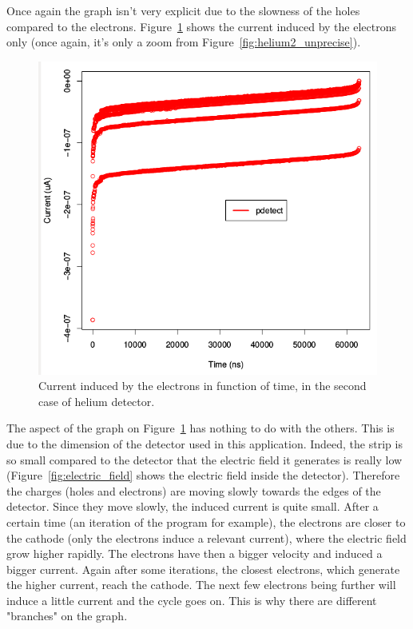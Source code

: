 \documentclass[11pt]{article}
\begin{document}
				Once again the graph isn't very explicit due to the slowness of the holes compared to the electrons.
				Figure~\ref{fig:helium2_precise} shows the current induced by the electrons only (once again, it's only
				a zoom from Figure~\ref{fig:helium2_unprecise}).

				\begin{figure}[H]
				  \center
				  \includegraphics[scale=0.4]{images/applications/helium2_precise.png}
				  \caption{Current induced by the electrons in function of time, in the second case of helium detector.}
				  \label{fig:helium2_precise}
				\end{figure}

				The aspect of the graph on Figure~\ref{fig:helium2_precise} has nothing to do with the others. This is due
				to the dimension of the detector used in this application. Indeed, the strip is so small compared to the
				detector that the electric field it generates is really low (Figure~\ref{fig:electric_field} shows the electric
				field inside the detector). Therefore the charges (holes and electrons) are moving slowly towards the edges of
				the detector. Since they move slowly, the induced current is quite small. After a certain time (an iteration
				of the program for example), the electrons are closer to the cathode (only the electrons induce a relevant current),
				where the electric field grow higher rapidly. The electrons have then a bigger velocity and induced a bigger
				current. Again after some iterations, the closest electrons, which generate the higher current, reach the cathode.
				The next few electrons being further will induce a little current and the cycle goes on. This is why there are
				different "branches" on the graph.
\end{document}

